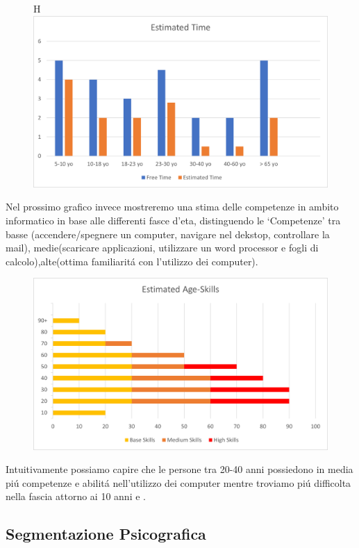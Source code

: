 \documentclass[../Report.tex]{subfiles}
\begin{document}
    \begin{figure}{H}
        \centering
        \includegraphics{EstimatedTime.png}
    \end{figure}

    Nel prossimo grafico invece mostreremo una stima delle competenze in ambito informatico in base alle differenti fasce d’eta, distinguendo le ‘Competenze’ tra basse (accendere/spegnere un computer, navigare nel dekstop, controllare la mail), medie(scaricare applicazioni, utilizzare un word processor e fogli di calcolo),alte(ottima familiaritá con l’utilizzo dei computer).

    \begin{figure}[H]
        \centering
        \includegraphics{EstimatedAgeSkills.png}
    \end{figure}

    Intuitivamente possiamo capire che le persone tra 20-40 anni possiedono in media piú competenze e abilitá nell’utilizzo dei computer mentre troviamo piú difficolta nella fascia attorno ai 10 anni e .
    \subsection{Segmentazione Psicografica}
\end{document}
